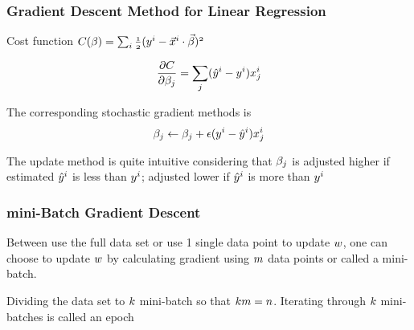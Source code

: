 \documentclass[notheorems, aspectratio=54]{beamer}
\begin{document}
\begin{frame}

\frametitle{Gradient Descent Method for Linear Regression}
Cost function $\mathnormal{C(\beta)=\sum_i\frac{1}{2}(y^i-\vec{x}^i\cdot\vec{\beta})^2}$

$$\mathnormal{\frac{\partial C}{\partial \beta_j}=\sum_j(\hat{y}^i-y^i)x_j^i}$$

The corresponding stochastic gradient methods is 
$$\mathnormal{\beta_j\leftarrow \beta_j+\epsilon(y^i-\hat{y}^i)x_j^i}$$

The update method is quite intuitive considering that $\mathnormal{\beta_j}$ is adjusted higher if estimated $\mathnormal{\hat{y}^i}$ is less than $\mathnormal{y^i}$; adjusted lower if $\mathnormal{\hat{y}^i}$ is more than $\mathnormal{y^i}$

\end{frame}	

\begin{frame}

\frametitle{mini-Batch Gradient Descent}

Between use the full data set or use 1 single data point to update $\mathnormal{ w}$, one can choose to update $\mathnormal{w}$ by calculating gradient using $\mathnormal{m}$ data points or called a mini-batch. 

Dividing the data set to $\mathnormal{k}$ mini-batch so that $\mathnormal{km=n}$. Iterating through $\mathnormal{k}$ mini-batches is called an epoch

\end{frame}	
\end{document}

